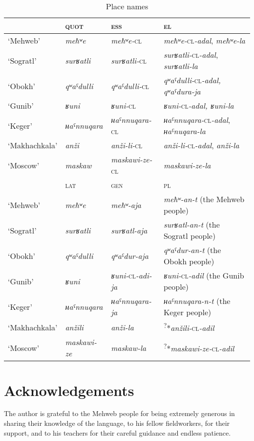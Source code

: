 ﻿\documentclass[output=paper]{langsci/langscibook}
\begin{document}
\begin{table}[h]
  \vspace{-\jot}
  \caption{Place names}\label{tab:3:39}
  \advance\tabcolsep-3pt
\begin{tabular}{@{}llll@{}}
\toprule
& \textsc{quot} & \textsc{ess} & \textsc{el}\tabularnewline \midrule
`Mehweb' & \emph{meħʷe} & \emph{meħʷe-}\textsc{cl} &
\emph{meħʷe-}\textsc{cl}\emph{-adal}, \emph{meħʷe-la}\tabularnewline
`Sogratl' & \emph{surʁatli} & \emph{surʁatli-}\textsc{cl} &
\emph{surʁatli-}\textsc{cl}\emph{-adal},
\emph{surʁatli-la}\tabularnewline
`Obokh' & \emph{qʷaˤdulli} & \emph{qʷaˤdulli-}\textsc{cl} &
\emph{qʷaˤdulli-}\textsc{cl}\emph{-adal, qʷaˤdura-ja}\tabularnewline
`Gunib' & \emph{ʁuni} & \emph{ʁuni-}\textsc{cl} &
\emph{ʁuni-}\textsc{cl}\emph{-adal, ʁuni-la}\tabularnewline
`Keger' & \emph{ʜaˤnnuqara} & \emph{ʜaˤnnuqara-}\textsc{cl} &
\emph{ʜaˤnnuqara-}\textsc{cl}\emph{-adal},
\emph{ʜaˤnuqara-la}\tabularnewline
`Makhachkala' & \emph{anži} & \emph{anži-li-}\textsc{cl} &
\emph{anži-li-}\textsc{cl}\emph{-adal}, \emph{anži-la}\tabularnewline
`Moscow' & \emph{maskaw} & \emph{maskawi-ze-}\textsc{cl} &
\emph{maskawi-ze-la}\tabularnewline \midrule
& \textsc{lat} & \textsc{gen} & \textsc{pl}\tabularnewline \midrule
`Mehweb' & \emph{meħʷe} & \emph{meħʷ-aja} & \emph{meħʷ-an-t} (the Mehweb
people)\tabularnewline
`Sogratl' & \emph{surʁatli} & \emph{surʁatl-aja} & \emph{surʁatl-an-t}
(the Sogratl people)\tabularnewline
`Obokh' & \emph{qʷaˤdulli} & \emph{qʷaˤdur-aja} & \emph{qʷaˤdur-an-t}
(the Obokh people)\tabularnewline
`Gunib' & \emph{ʁuni} & \emph{ʁuni-}\textsc{cl}\emph{-adi}\emph{-ja} &
\emph{ʁuni-}\textsc{cl}\emph{-adil} (the Gunib people)\tabularnewline
`Keger' & \emph{ʜaˤnnuqara} & \emph{ʜaˤnnuqara-ja} &
\emph{ʜaˤnnuqara-n-t} (the Keger people)\tabularnewline
`Makhachkala' & \emph{anžili} & \emph{anži-la} &
\textsuperscript{?}*\emph{anžili-}\textsc{cl}\emph{-adil}\tabularnewline
`Moscow' & \emph{maskawi-ze} & \emph{maskaw-la} &
\textsuperscript{?}*\emph{maskawi-ze-}\textsc{cl}\emph{-adil}\tabularnewline
\bottomrule
\end{tabular}
  \vspace{-\jot}
\end{table}



\section*{Acknowledgements}

The author is grateful to the Mehweb people for being extremely
  generous in sharing their knowledge of the language, to his fellow
  fieldworkers, for their support, and to his teachers for their
  careful guidance and endless patience.
\end{document}
